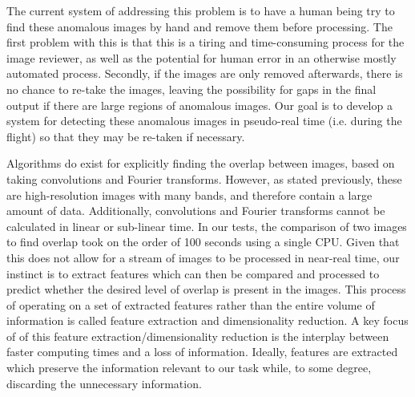 The current system of addressing this problem is to have a human being try to find these anomalous images by hand and remove them before processing.
The first problem with this is that this is a tiring and time-consuming process for the image reviewer, as well as the potential for human error in an otherwise mostly automated process.
Secondly, if the images are only removed afterwards, there is no chance to re-take the images, leaving the possibility for gaps in the final output if there are large regions of anomalous images.
Our goal is to develop a system for detecting these anomalous images in pseudo-real time (i.e. during the flight) so that they may be re-taken if necessary.

Algorithms do exist for explicitly finding the overlap between images, based on taking convolutions and Fourier \cite{einstein} transforms.
However, as stated previously, these are high-resolution images with many bands, and therefore contain a large amount of data.
Additionally, convolutions and Fourier transforms cannot be calculated in linear or sub-linear time.
In our tests, the comparison of two images to find overlap took on the order of 100 seconds using a single CPU.
Given that this does not allow for a stream of images to be processed in near-real time, our instinct is to extract features which can then be compared and processed to predict whether the desired level of overlap is present in the images.
This process of operating on a set of extracted features rather than the entire volume of information is called feature extraction and dimensionality reduction.
A key focus of of this feature extraction/dimensionality reduction is the interplay between faster computing times and a loss of information.
Ideally, features are extracted which preserve the information relevant to our task while, to some degree, discarding the unnecessary information.



 

